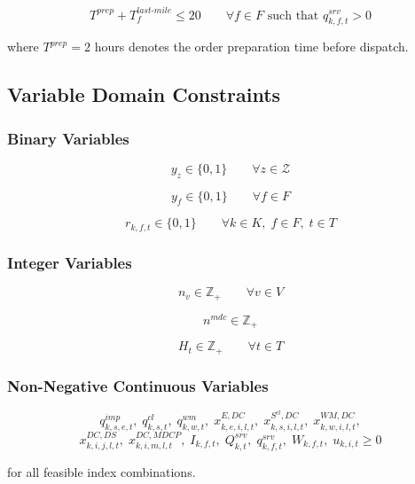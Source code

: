 \documentclass[12pt]{article}
\begin{document}
\[
T^{prep} + T^{last\text{-}mile}_{f} \leq 20
\qquad
\forall f \in F \text{ such that } q^{srv}_{k,f,t} > 0
\]

where \(T^{prep}=2\) hours denotes the order preparation time before dispatch.

\subsection{Variable Domain Constraints}

\subsubsection{Binary Variables}

\[
y_z \in \{0,1\}
\qquad \forall z \in \mathcal{Z}
\]

\[
y_f \in \{0,1\}
\qquad \forall f \in F
\]

\[
r_{k,f,t} \in \{0,1\}
\qquad \forall k \in K,\; f \in F,\; t \in T
\]

\subsubsection{Integer Variables}

\[
n_v \in \mathbb{Z}_{+}
\qquad \forall v \in V
\]

\[
n^{mdc} \in \mathbb{Z}_{+}
\]

\[
H_t \in \mathbb{Z}_{+}
\qquad \forall t \in T
\]

\subsubsection{Non-Negative Continuous Variables}

\[
q^{imp}_{k,s,e,t},\;
q^{cl}_{k,s,t},\;
q^{wm}_{k,w,t},\;
x^{E,DC}_{k,e,i,l,t},\;
x^{S^{cl},DC}_{k,s,i,l,t},\;
x^{WM,DC}_{k,w,i,l,t},
\]
\[
x^{DC,DS}_{k,i,j,l,t},\;
x^{DC,MDCP}_{k,i,m,l,t},\;
I_{k,f,t},\;
Q^{srv}_{k,t},\;
q^{srv}_{k,f,t},\;
W_{k,f,t},\;
u_{k,i,t}
\geq 0
\]

for all feasible index combinations.
\end{document}
